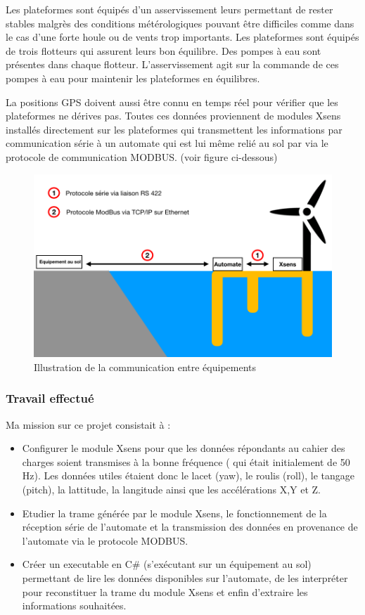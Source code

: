 Les plateformes sont équipés d'un asservissement leurs permettant de rester stables malgrès des conditions métérologiques pouvant être difficiles comme dans le cas d'une forte houle ou de vents trop importants. Les plateformes sont équipés de trois flotteurs qui assurent leurs bon équilibre. Des pompes à eau sont présentes dans chaque flotteur. L'asservissement agit sur la commande de ces pompes à eau pour maintenir les plateformes en équilibres. 

La positions GPS doivent aussi être connu en temps réel pour vérifier que les plateformes ne dérives pas. 
Toutes ces données proviennent de modules Xsens installés directement sur les plateformes qui transmettent les informations par communication série à un automate qui est lui même relié au sol par via le protocole de communication MODBUS.  (voir figure ci-dessous)
\newpage


\begin{figure}[ht]
    \centering
    \includegraphics[scale=0.45]{img/schKOWL.png}
    \caption{Illustration de la communication entre équipements }
    \label{fig:CameraCmdsettings}
\end{figure}

\subsubsection{Travail effectué}

Ma mission sur ce projet consistait à : 

\begin{itemize}
	\item Configurer le module Xsens pour que les données répondants au cahier des charges soient transmises à la bonne fréquence ( qui était initialement de 50 Hz). Les données utiles étaient donc le lacet (yaw), le roulis (roll), le tangage (pitch), la lattitude, la langitude ainsi que les accélérations X,Y et Z. 
	\item Etudier la trame générée par le module Xsens, le fonctionnement de la réception série de l'automate et la transmission des données en provenance de l'automate via le protocole MODBUS. 
	\item Créer un executable en C\# (s'exécutant sur un équipement au sol) permettant de lire les données disponibles sur l'automate, de les interpréter pour reconstituer la trame du module Xsens et enfin d'extraire les informations souhaitées. 

\end{itemize}

